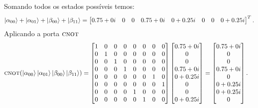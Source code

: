 Somando todos os estados possíveis temos:
\begin{equation}
  \ket{\alpha_{00}}+\ket{\alpha_{01}}+\ket{\beta_{00}}+\ket{\beta_{11}} =
  \begin{bmatrix} {0.75+0i} & 0 & 0 & {0.75+0i} & {0+0.25i} & 0 & 0 & {0+0.25i} \end{bmatrix}^T.
\end{equation}
Aplicando a porta \(\operatorname{\textsc{cnot}}\)
\begin{equation}
  \begin{split}
    \operatorname{\textsc{cnot}} (\ket{\alpha_{00}}\ket{\alpha_{01}}\ket{\beta_{00}}\ket{\beta_{11}}) &=
    \begin{bmatrix}
    1 & 0 & 0 & 0 & 0 & 0 & 0 & 0 \\
    0 & 1 & 0 & 0 & 0 & 0 & 0 & 0 \\
    0 & 0 & 1 & 0 & 0 & 0 & 0 & 0 \\
    0 & 0 & 0 & 1 & 0 & 0 & 0 & 0 \\
    0 & 0 & 0 & 0 & 0 & 0 & 1 & 0 \\
    0 & 0 & 0 & 0 & 0 & 0 & 0 & 1 \\
    0 & 0 & 0 & 0 & 1 & 0 & 0 & 0 \\
    0 & 0 & 0 & 0 & 0 & 1 & 0 & 0
    \end{bmatrix}
    \begin{bmatrix} {0.75+0i} \\ 0 \\ 0 \\ {0.75+0i} \\ {0+0.25i} \\ 0 \\ 0 \\ {0+0.25i} \end{bmatrix} =
    \begin{bmatrix} {0.75+0i} \\ 0 \\ 0 \\ {0.75+0i} \\ 0 \\ {0+0.25i} \\ {0+0.25i} \\ 0 \end{bmatrix}.
  \end{split}
\end{equation}

